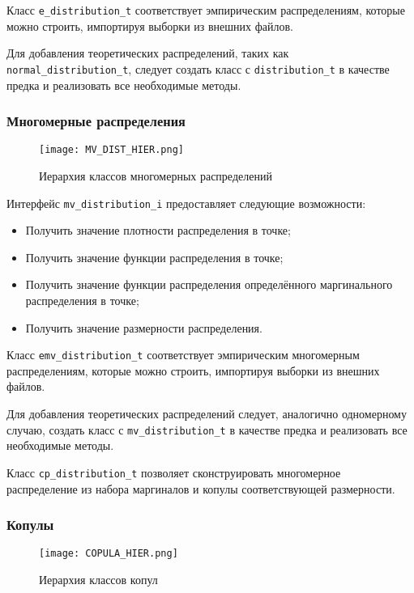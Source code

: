 Класс \texttt{e\_distribution\_t} соответствует эмпирическим распределениям, которые можно строить, импортируя выборки из внешних файлов.

Для добавления теоретических распределений, таких как \texttt{normal\_distribution\_t}, следует создать класс с \texttt{distribution\_t} в качестве предка и реализовать все необходимые методы.

\subsubsection*{Многомерные распределения}

\begin{figure}[H]
	\centering
	\texttt{[image: MV\_DIST\_HIER.png]}
	\caption{Иерархия классов многомерных распределений}
\end{figure}

Интерфейс \texttt{mv\_distribution\_i} предоставляет следующие возможности:
\begin{itemize}
  \item Получить значение плотности распределения в точке;
  \item Получить значение функции распределения в точке;
  \item Получить значение функции распределения определённого маргинального распределения в точке;
  \item Получить значение размерности распределения.
\end{itemize}

Класс \texttt{emv\_distribution\_t} соответствует эмпирическим многомерным распределениям, которые можно строить, импортируя выборки из внешних файлов.

Для добавления теоретических распределений следует, аналогично одномерному случаю, создать класс с \texttt{mv\_distribution\_t} в качестве предка и реализовать все необходимые методы.

Класс \texttt{cp\_distribution\_t} позволяет сконструировать многомерное распределение из набора маргиналов и копулы соответствующей размерности.

\subsubsection*{Копулы}

\begin{figure}[H]
	\centering
	\texttt{[image: COPULA\_HIER.png]}
	\caption{Иерархия классов копул}
\end{figure}

